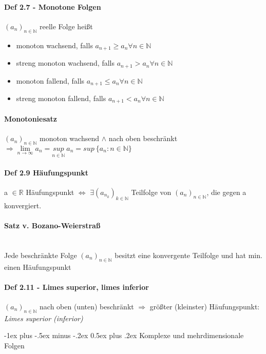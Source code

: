 \documentclass[paper=a3,paper=landscape, fontsize=9pt,DIV=25]{scrartcl}
\makeatletter
\newcommand{\real}{{\mathbb{R}}}
\newcommand{\nat}{\mathbb{N}}
\newcommand{\aseq}{(a_n)_{n \in \nat}}
\renewcommand{\section}{\@startsection{section}{1}{0mm}%
  {-1ex plus -.5ex minus -.2ex}%
  {0.5ex plus .2ex}%
  {\color{blue}\normalfont\large\bfseries}}
\makeatother
\begin{document}
\begin{multicols*}{4}
  \paragraph{Def 2.7 - Monotone Folgen}
  $\aseq$ reelle Folge heißt
  \begin{itemize}
  \item monoton wachsend, falls $a_{n+1} \geq a_n \forall n \in \nat$
  \item streng monoton wachsend, falls  $a_{n+1} > a_n \forall n \in \nat$
  \item monoton fallend, falls  $a_{n+1} \leq a_n \forall n \in \nat$
  \item streng monoton fallend, falls  $a_{n+1} < a_n \forall n \in \nat$
  \end{itemize}
 
 \paragraph{Monotoniesatz}
 $\aseq$ monoton wachsend $\wedge$ nach oben beschränkt $\Rightarrow \lim\limits_{n \rightarrow \infty} a_n = \underset{n \in \nat}{sup}\:a_n = sup\:\{a_n:n \in \nat\}$


  \paragraph{Def 2.9 Häufungspunkt}
  a $\in \real$ Häufungspunkt $\Leftrightarrow$ $ \exists (a_{n_k})_{k \in \nat}$ Teilfolge von $\aseq$, die gegen a konvergiert.


 \paragraph{Satz v. Bozano-Weierstraß}\hspace{0pt} \\
 Jede beschränkte Folge $\aseq$ besitzt eine konvergente Teilfolge und hat min. einen Häufungspunkt


  \paragraph{Def 2.11 - Limes superior, limes inferior}
  $\aseq$ nach oben (unten) beschränkt $\Rightarrow$ größter (kleinster) Häufungspunkt: \emph{Limes superior (inferior)}



\section{Komplexe und mehrdimensionale Folgen}


\end{multicols*}
\end{document}
